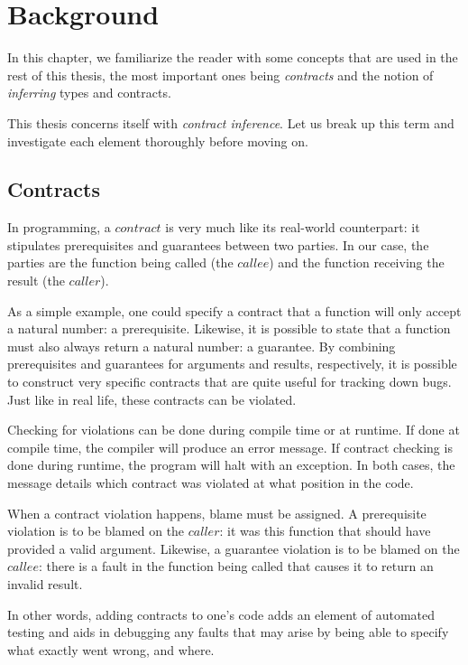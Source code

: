 \documentclass[10pt]{report}
\begin{document}
\chapter{Background}

In this chapter, we familiarize the reader with some concepts that are used in the rest of this thesis, the most important ones being \textit{contracts} and the notion of \textit{inferring} types and contracts.

This thesis concerns itself with \textit{contract inference}.
Let us break up this term and investigate each element thoroughly before moving on.

\section{Contracts}
In programming, a $contract$ is very much like its real-world counterpart: it stipulates prerequisites and guarantees between two parties.
In our case, the parties are the function being called (the $callee$) and the function receiving the result (the $caller$).

As a simple example, one could specify a contract that a function will only accept a natural number: a prerequisite.
Likewise, it is possible to state that a function must also always return a natural number: a guarantee.
By combining prerequisites and guarantees for arguments and results, respectively, it is possible to construct very specific contracts that are quite useful for tracking down bugs.
Just like in real life, these contracts can be violated.

Checking for violations can be done during compile time or at runtime.
If done at compile time, the compiler will produce an error message.
If contract checking is done during runtime, the program will halt with an exception.
In both cases, the message details which contract was violated at what position in the code.

When a contract violation happens, blame must be assigned.
A prerequisite violation is to be blamed on the $caller$: it was this function that should have provided a valid argument.
Likewise, a guarantee violation is to be blamed on the $callee$: there is a fault in the function being called that causes it to return an invalid result.

In other words, adding contracts to one's code adds an element of automated testing and aids in debugging any faults that may arise by being able to specify what exactly went wrong, and where.
\end{document}
